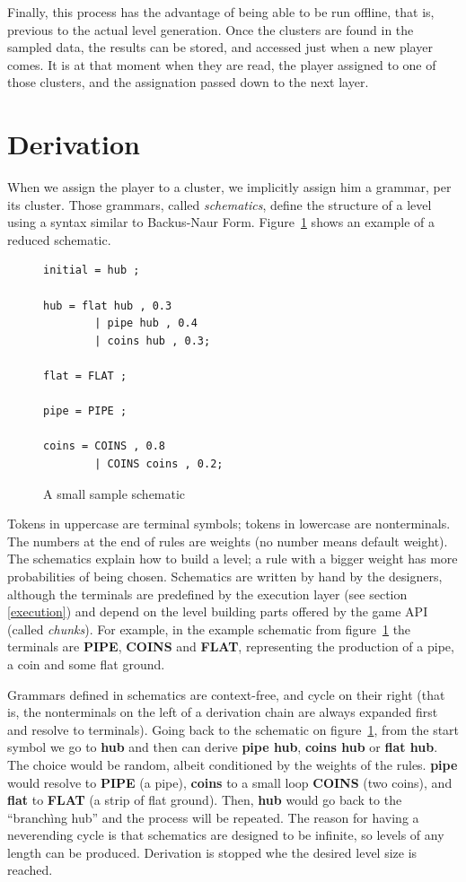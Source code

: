 \documentclass[conference]{IEEEtran}
\begin{document}
Finally, this process has the advantage of being able to be run offline, that is, previous to the actual level generation. Once the clusters are found in the sampled data, the results can be stored, and accessed just when a new player comes. It is at that moment when they are read, the player assigned to one of those clusters, and the assignation passed down to the next layer.




\section{Derivation}
\label{derivation}

When we assign the player to a cluster, we implicitly assign him a grammar, per its cluster. Those grammars, called \textit{schematics}, define the structure of a level using a syntax similar to Backus-Naur Form. Figure~\ref{minigrammar} shows an example of a reduced schematic.

\begin{figure}[htp]
	\begin{lstlisting}
initial = hub ;

hub = flat hub , 0.3
		| pipe hub , 0.4
		| coins hub , 0.3;

flat = FLAT ;

pipe = PIPE ;

coins = COINS , 0.8
		| COINS coins , 0.2;
	\end{lstlisting}
\caption{A small sample schematic}
\label{minigrammar}
\end{figure}

Tokens in uppercase are terminal symbols; tokens in lowercase are nonterminals. The numbers at the end of rules are weights (no number means default weight). The schematics explain how to build a level; a rule with a bigger weight has more probabilities of being chosen. Schematics are written by hand by the designers, although the terminals are predefined by the execution layer (see section \ref{execution}) and depend on the level building parts offered by the game API (called \textit{chunks}). For example, in the example schematic from figure~\ref{minigrammar} the terminals are \textbf{PIPE}, \textbf{COINS} and \textbf{FLAT}, representing the production of a pipe, a coin and some flat ground.

Grammars defined in schematics are context-free, and cycle on their right (that is, the nonterminals on the left of a derivation chain are always expanded first and resolve to terminals). Going back to the schematic on figure~\ref{minigrammar}, from the start symbol we go to \textbf{hub} and then can derive \textbf{pipe hub}, \textbf{coins hub} or \textbf{flat hub}. The choice would be random, albeit conditioned by the weights of the rules. \textbf{pipe} would resolve to \textbf{PIPE} (a pipe), \textbf{coins} to a small loop \textbf{COINS} (two coins), and \textbf{flat} to \textbf{FLAT} (a strip of flat ground). Then, \textbf{hub} would go back to the ``branchìng hub'' and the process will be repeated. The reason for having a neverending cycle is that schematics are designed to be infinite, so levels of any length can be produced. Derivation is stopped whe the desired level size is reached.
\end{document}
